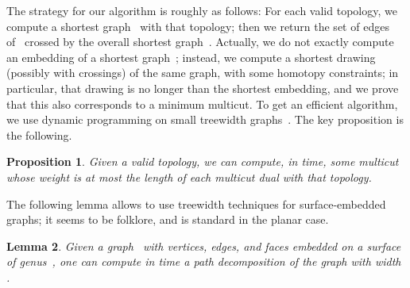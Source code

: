 \documentclass[11pt]{article}
\theoremstyle{plain}  \newtheorem{theorem}{Theorem}[section]
\newtheorem{lemma}[theorem]{Lemma}
\newtheorem{proposition}[theorem]{Proposition}
\theoremstyle{definition}
\begin{document}
The strategy for our algorithm is roughly as follows: For each valid
topology, we compute a shortest graph~ with that topology; then we
return the set of edges of~ crossed by the overall shortest graph~.
Actually, we do not exactly compute an embedding of a shortest graph~;
instead, we compute a shortest drawing (possibly with crossings) of the
same graph, with some homotopy constraints; in particular, that drawing is
no longer than the shortest embedding, and we prove that this also
corresponds to a minimum multicut.  To get an efficient algorithm, we use
dynamic programming on small treewidth graphs~\cite{b-dpgbt-88}.  The key
proposition is the following.
\begin{proposition}\label{P:enumvert}
  Given a valid topology, we can compute, in
   time, some multicut whose
  weight is at most the length of each multicut dual with that topology.
\end{proposition}
The following lemma allows to use treewidth techniques for surface-embedded
graphs; it seems to be folklore, and is standard in the planar case.
\begin{lemma}\label{L:treewidth}
  Given a graph~ with  vertices, edges, and faces embedded on a
  surface of genus~, one can compute in  time a path
  decomposition of the graph with width .
\end{lemma}
\end{document}
